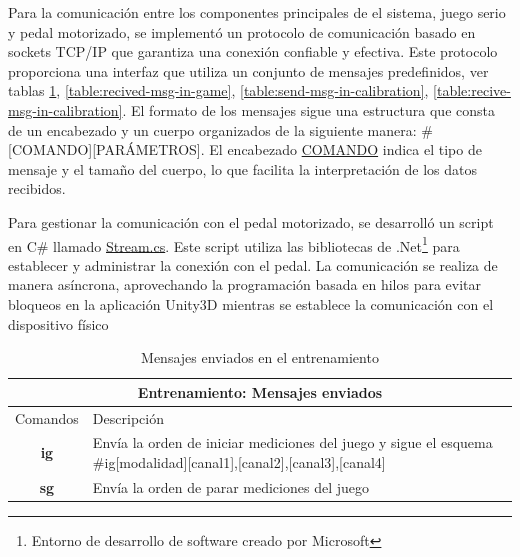Para la comunicación entre los componentes principales de el sistema, juego serio y pedal motorizado, se implementó un protocolo de comunicación basado en sockets TCP/IP que garantiza una conexión confiable y efectiva. Este protocolo proporciona una interfaz que utiliza un conjunto de mensajes predefinidos, ver tablas 
\ref{table:send-msg-in-game}, 
\ref{table:recived-msg-in-game}, 
\ref{table:send-msg-in-calibration}, 
\ref{table:recive-msg-in-calibration}. El formato de los mensajes sigue una estructura que consta de un encabezado y un cuerpo organizados de la siguiente manera: \#[COMANDO][PARÁMETROS]. El encabezado \underline{COMANDO} indica el tipo de mensaje y el tamaño del cuerpo, lo que facilita la interpretación de los datos recibidos.

\vspace{5pt} 
Para gestionar la comunicación con el pedal motorizado, se desarrolló un script en C\# llamado \underline{Stream.cs}. Este script utiliza las bibliotecas de .Net\footnote{Entorno de desarrollo de software creado por Microsoft} para establecer y administrar la conexión con el pedal. La comunicación se realiza de manera asíncrona, aprovechando la programación basada en hilos para evitar bloqueos en la aplicación Unity3D mientras se establece la comunicación con el dispositivo físico
    
\vspace{20pt}
\begin{table}[h]
    \centering
    \begin{tabular}{ |c|p{14cm}|}
        \hline
        \multicolumn{2}{|c|}{Entrenamiento: Mensajes enviados} \\
        \hline
        Comandos        &   Descripción \\\hline
        \textbf{ig}     &   \begin{minipage}{14cm}
                                \vspace{2pt}

                                Envía la orden de iniciar mediciones del juego y sigue el esquema \#ig[modalidad][canal1],[canal2],[canal3],[canal4]
                                
                                \vspace{2pt}   
                            \end{minipage}\\\hline 
        \textbf{sg}     &   Envía la orden de parar mediciones del juego \\\hline   
                                
    \end{tabular}
    \caption{Mensajes enviados en el entrenamiento}
    \label{table:send-msg-in-game}
\end{table}

